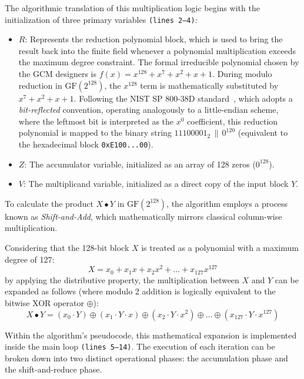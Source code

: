 \documentclass[11pt,a4paper]{report}
\begin{document}
The algorithmic translation of this multiplication logic begins with the initialization of three primary variables \texttt{(lines 2--4)}:
\begin{itemize}
    \item $R$: Represents the reduction polynomial block, which is used to bring the result back into the finite field whenever a polynomial multiplication exceeds the maximum degree constraint. 
    The formal irreducible polynomial chosen by the GCM designers is $f(x) = x^{128} + x^7 + x^2 + x + 1$. 
    During modulo reduction in $\mathrm{GF}(2^{128})$, the $x^{128}$ term is mathematically substituted by $x^7 + x^2 + x + 1$. 
    Following the NIST SP 800-38D standard~\cite{GCM}, which adopts a \textit{bit-reflected} convention, operating analogously to a little-endian scheme, where the leftmost bit is interpreted as the $x^0$ coefficient, this reduction polynomial is mapped to the binary string $11100001_2 \,\|\, 0^{120}$ (equivalent to the hexadecimal block \texttt{0xE100...00}).
    
    \item $Z$: The accumulator variable, initialized as an array of 128 zeros ($0^{128}$).
    
    \item $V$: The multiplicand variable, initialized as a direct copy of the input block $Y$.
\end{itemize}

To calculate the product $X \bullet Y$ in $\mathrm{GF}(2^{128})$, the algorithm employs a process known as \textit{Shift-and-Add}, which mathematically mirrors classical column-wise multiplication. 

Considering that the 128-bit block $X$ is treated as a polynomial with a maximum degree of 127:
\[
X = x_0 + x_1x + x_2x^2 + \dots + x_{127}x^{127}
\]
by applying the distributive property, the multiplication between $X$ and $Y$ can be expanded as follows (where modulo 2 addition is logically equivalent to the bitwise XOR operator $\oplus$):
\[
X \bullet Y = (x_0 \cdot Y) \oplus (x_1 \cdot Y \cdot x) \oplus (x_2 \cdot Y \cdot x^2) \oplus \dots \oplus (x_{127} \cdot Y \cdot x^{127})
\]

Within the algorithm's pseudocode, this mathematical expansion is implemented inside the main loop \texttt{(lines 5--14)}. 
The execution of each iteration can be broken down into two distinct operational phases: the accumulation phase and the shift-and-reduce phase.
\end{document}
